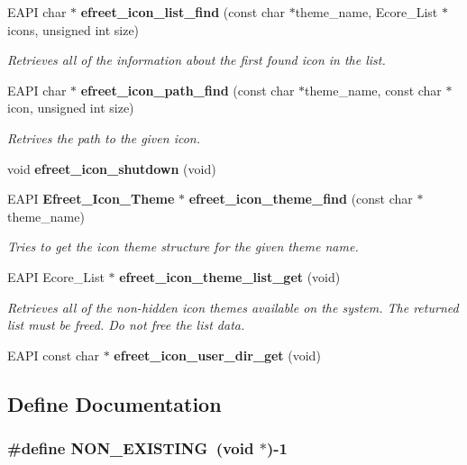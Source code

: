 \begin{CompactItemize}
\item 
EAPI char $\ast$ {\bf efreet\_\-icon\_\-list\_\-find} (const char $\ast$theme\_\-name, Ecore\_\-List $\ast$icons, unsigned int size)
\begin{CompactList}\small\item\em Retrieves all of the information about the first found icon in the list. \item\end{CompactList}\item 
EAPI char $\ast$ {\bf efreet\_\-icon\_\-path\_\-find} (const char $\ast$theme\_\-name, const char $\ast$icon, unsigned int size)
\begin{CompactList}\small\item\em Retrives the path to the given icon. \item\end{CompactList}\item 
void {\bf efreet\_\-icon\_\-shutdown} (void)
\item 
EAPI {\bf Efreet\_\-Icon\_\-Theme} $\ast$ {\bf efreet\_\-icon\_\-theme\_\-find} (const char $\ast$theme\_\-name)
\begin{CompactList}\small\item\em Tries to get the icon theme structure for the given theme name. \item\end{CompactList}\item 
EAPI Ecore\_\-List $\ast$ {\bf efreet\_\-icon\_\-theme\_\-list\_\-get} (void)
\begin{CompactList}\small\item\em Retrieves all of the non-hidden icon themes available on the system. The returned list must be freed. Do not free the list data. \item\end{CompactList}\item 
EAPI const char $\ast$ {\bf efreet\_\-icon\_\-user\_\-dir\_\-get} (void)
\end{CompactItemize}


\subsection{Define Documentation}
\subsubsection[NON\_\-EXISTING]{\setlength{\rightskip}{0pt plus 5cm}\#define NON\_\-EXISTING~(void $\ast$)-1}\label{efreet__icon_8c_3da87339a2ab67dd100b8fc9efa92247}




